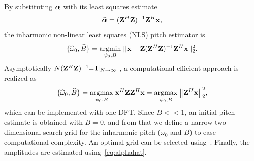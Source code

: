 \documentclass{article}
\begin{document}
By substituting $\text{\boldmath$\alpha$}$ with its least squares estimate
\begin{equation}\label{eq:alphahat}
  \text{\boldmath${\widehat\alpha}$} = (\mathbf{Z}^H\mathbf{Z})^{-1}\mathbf{Z}^H\mathbf x,
\end{equation}
the inharmonic non-linear least squares (NLS) pitch estimator is
\begin{equation}\label{eq:psi_B_est}
  \{ \widehat\omega_0, \widehat B \}= \underset{\psi_0, B}{\operatorname{argmin}}\;{|| \mathbf x - \mathbf{Z}(\mathbf{Z}^H\mathbf{Z})^{-1}\mathbf{Z}^H\mathbf x}||_2^2.
\end{equation}
Asymptotically $N(\mathbf{Z}^H\mathbf{Z})^{-1}\!\!=\!\mathbf{I}|_{N\to\infty}$ , a computational efficient approach is realized as
\begin{equation} \label{eq:ANLS}
    \{\widehat\omega_0, \widehat B \} = \underset{\psi_0,B}{\operatorname{argmax}}\;{\mathbf x^H \mathbf{Z} \mathbf{Z}^H \mathbf x} = \underset{\psi_0,B}{\operatorname{argmax}}\;{ \left\lVert\mathbf{Z}^H\mathbf x\right\rVert_2^2},
\end{equation}
which can be implemented with one DFT. Since $B\!<\!<\!1$, an initial pitch estimate is obtained with $B=0$, and from that we define a narrow two dimensional search grid for the inharmonic pitch ($\omega_0$ and $B$) to ease computational complexity. An optimal grid can be selected using~\cite{jkn:grid_size}. Finally, the amplitudes are estimated using~\eqref{eq:alphahat}.
%
%
%
%
%
%
\end{document}
